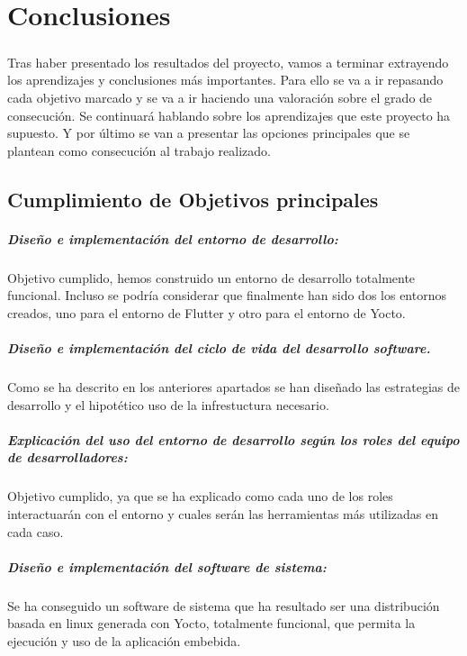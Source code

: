 \chapter{Conclusiones}\label{sec:conclusiones}

\paragraph{}Tras haber presentado los resultados del proyecto, vamos a terminar extrayendo
los aprendizajes y conclusiones más importantes. Para ello se va a ir repasando cada
objetivo marcado y se va a ir haciendo una valoración sobre el grado de consecución.
Se continuará hablando sobre los aprendizajes que este proyecto ha supuesto. Y por
último se van a presentar las opciones principales que se plantean como consecución al
trabajo realizado.

\section{Cumplimiento de Objetivos principales}

\paragraph{\checkmark Diseño e implementación del entorno de desarrollo:} Objetivo
cumplido, hemos construido un entorno de desarrollo totalmente funcional. Incluso se
podría considerar que finalmente han sido dos los entornos creados, uno para el entorno
de Flutter y otro para el entorno de Yocto.

\paragraph{\checkmark Diseño e implementación del ciclo de vida del desarrollo software.}
Como se ha descrito en los anteriores apartados se han diseñado las estrategias de desarrollo
y el hipotético uso de la infrestuctura necesario.

\paragraph{\checkmark Explicación del uso del entorno de desarrollo según los roles del
equipo de desarrolladores:} Objetivo cumplido, ya que se ha explicado como cada uno de
los roles interactuarán con el entorno y cuales serán las herramientas más utilizadas
en cada caso.

\paragraph{\checkmark Diseño e implementación del software de sistema:} Se ha conseguido
un software de sistema que ha resultado ser una distribución basada en linux generada
con Yocto, totalmente funcional, que permita la ejecución y uso de la aplicación embebida.

